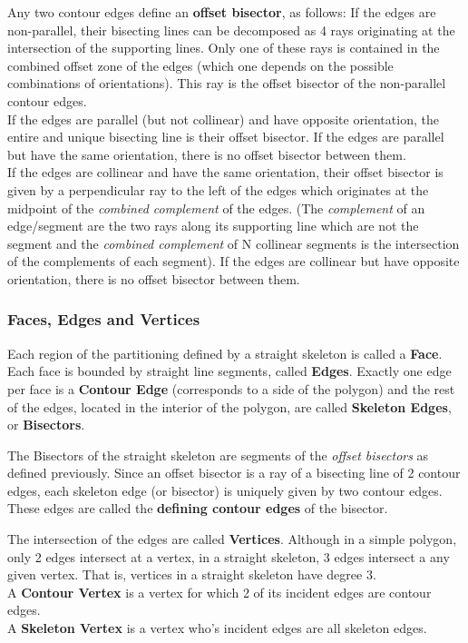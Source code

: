 Any two contour edges define an \textbf{offset bisector}, as follows:
If the edges are non-parallel, their bisecting lines can be decomposed as 4 rays originating at the intersection of the supporting lines. Only one of these rays is contained in the combined offset zone of the  edges (which one depends on the possible combinations of orientations). This ray is the offset bisector of the non-parallel contour edges.\\
If the edges are parallel (but not collinear) and have opposite orientation, the entire and unique bisecting line is their offset bisector. If the edges are parallel but have the same orientation, there is no offset bisector between them.\\
If the edges are collinear and have the same orientation, their offset bisector is given by a perpendicular ray to the left of the edges which originates at the midpoint of the \textit{combined complement} of the edges. (The \textit{complement} of an edge/segment are the two rays along its supporting line which are not the segment and the \textit{combined complement} of N collinear segments is the intersection of the complements of each segment). If the edges are collinear but have opposite orientation, there is no offset bisector between them.


\subsubsection{Faces, Edges and Vertices}

Each region of the partitioning defined by a straight skeleton is called a \textbf{Face}. Each face is bounded by straight line segments, called \textbf{Edges}. Exactly one edge per face is a \textbf{Contour Edge} (corresponds to a side of the polygon) and the rest of the edges, located in the interior of the polygon, are called \textbf{Skeleton Edges}, or \textbf{Bisectors}.

The Bisectors of the straight skeleton are segments of the \textit{offset bisectors} as defined previously. Since an offset bisector is a ray of a bisecting line of 2 contour edges, each skeleton edge (or bisector) is  uniquely given by two contour edges. These edges are called the \textbf{defining contour edges} of the bisector. 

The intersection of the edges are called \textbf{Vertices}. Although in a simple polygon, only 2 edges intersect at a vertex, in a straight skeleton, 3 edges intersect a any given vertex. That is, vertices in a straight skeleton have degree 3.\\
A \textbf{Contour Vertex} is a vertex for which 2 of its incident edges are contour edges.\\
A \textbf{Skeleton Vertex} is a vertex who's incident edges are all skeleton edges.

